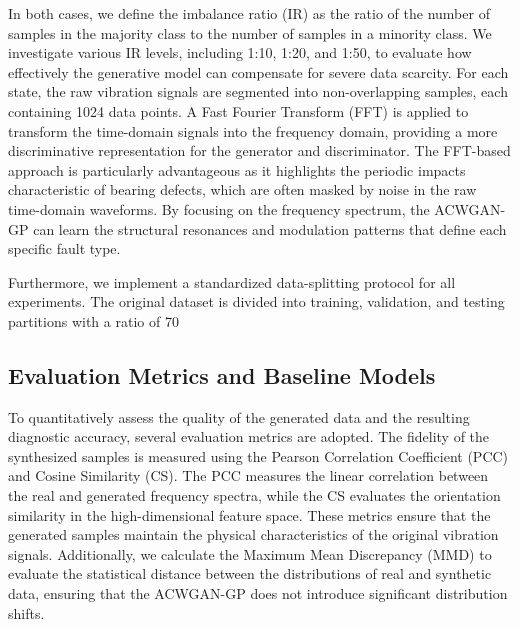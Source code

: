 In both cases, we define the imbalance ratio (IR) as the ratio of the number of samples in the majority class to the number of samples in a minority class. We investigate various IR levels, including 1:10, 1:20, and 1:50, to evaluate how effectively the generative model can compensate for severe data scarcity. For each state, the raw vibration signals are segmented into non-overlapping samples, each containing 1024 data points. A Fast Fourier Transform (FFT) is applied to transform the time-domain signals into the frequency domain, providing a more discriminative representation for the generator and discriminator. The FFT-based approach is particularly advantageous as it highlights the periodic impacts characteristic of bearing defects, which are often masked by noise in the raw time-domain waveforms. By focusing on the frequency spectrum, the ACWGAN-GP can learn the structural resonances and modulation patterns that define each specific fault type.

Furthermore, we implement a standardized data-splitting protocol for all experiments. The original dataset is divided into training, validation, and testing partitions with a ratio of 70%

\subsection{Evaluation Metrics and Baseline Models}
To quantitatively assess the quality of the generated data and the resulting diagnostic accuracy, several evaluation metrics are adopted. 
The fidelity of the synthesized samples is measured using the Pearson Correlation Coefficient (PCC) and Cosine Similarity (CS). The PCC measures the linear correlation between the real and generated frequency spectra, while the CS evaluates the orientation similarity in the high-dimensional feature space. These metrics ensure that the generated samples maintain the physical characteristics of the original vibration signals. Additionally, we calculate the Maximum Mean Discrepancy (MMD) to evaluate the statistical distance between the distributions of real and synthetic data, ensuring that the ACWGAN-GP does not introduce significant distribution shifts.

